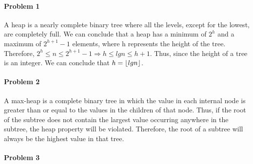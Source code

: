 \documentclass[11pt]{article}
\begin{document}
\MakeScribeTop


\paragraph{\noindent\textbf{\LARGE{Problem 1}}}


\begin{flushleft}
    A heap is a nearly complete binary tree where all the levels, except for the lowest,
    are completely full. We can conclude that a heap has a minimum of $2^h$ and a maximum of $2^{h+1} - 1$ elements,
    where h represents the height of the tree.
    \newline
    \newline
    Therefore, $2^{h} \leq n \leq 2^{h+1} - 1 \Rightarrow h \leq lg n \leq h + 1$. Thus, since the 
    height of a tree is an integer. We can conclude that $h = {\lfloor{lg n}\rfloor} $.

\end{flushleft}   

\paragraph{\noindent\textbf{\LARGE{Problem 2}}}

\begin{flushleft}
    A max-heap is a complete binary tree in which the value in each internal node is greater
    than or equal to the values in the children of that node.
    \newline
    \newline
    Thus, if the root of the subtree does not contain the largest value occurring anywhere in the subtree, the 
    heap property will be violated. Therefore, the root of a subtree will always be the highest value in that tree.
\end{flushleft}  

\paragraph{\noindent\textbf{\LARGE{Problem 3}}}
\end{document}
